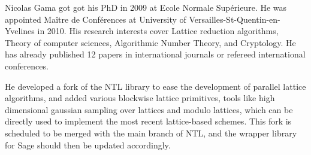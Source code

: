 \begin{picv}{Nicolas Gama}
  got got his PhD in 2009 at Ecole Normale Supérieure. He was appointed Maître de
  Conférences at University of Versailles-St-Quentin-en-Yvelines in 2010.  His research
  interests cover Lattice reduction algorithms, Theory of computer sciences, Algorithmic
  Number Theory, and Cryptology. He has already published 12 papers in international
  journals or refereed international conferences.

  He developed a fork of the NTL library to ease the development of parallel lattice
  algorithms, and added various blockwise lattice primitives, tools like high dimensional
  gaussian sampling over lattices and modulo lattices, which can be directly used to
  implement the most recent lattice-based schemes. This fork is scheduled to be merged
  with the main branch of NTL, and the wrapper library for Sage should then be updated
  accordingly.
\end{picv}
